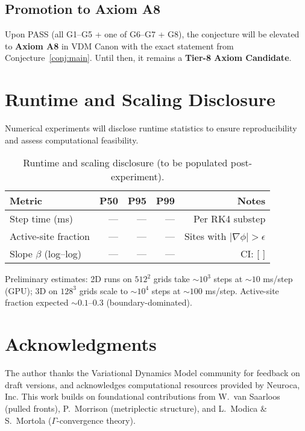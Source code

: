 \documentclass{article}
\begin{document}
\subsection{Promotion to Axiom A8}

Upon PASS (all G1--G5 + one of G6--G7 + G8), the conjecture will be elevated to \textbf{Axiom A8} in VDM Canon with the exact statement from Conjecture~\ref{conj:main}. Until then, it remains a \textbf{Tier-8 Axiom Candidate}.

\section{Runtime and Scaling Disclosure}
\label{sec:runtime}

Numerical experiments will disclose runtime statistics to ensure reproducibility and assess computational feasibility.

\begin{table}[t]
  \centering
  \caption{Runtime and scaling disclosure (to be populated post-experiment).}
  \label{tab:runtime}
  \begin{tabular}{@{}lrrrr@{}}
  \toprule
  Metric & P50 & P95 & P99 & Notes \\
  \midrule
  Step time (ms) & --- & --- & --- & Per RK4 substep \\
  Active-site fraction & --- & --- & --- & Sites with $|\nabla\phi|>\epsilon$ \\
  Slope $\beta$ (log--log) & --- & --- & --- & CI: [\,\,] \\
  \bottomrule
  \end{tabular}
\end{table}

Preliminary estimates: 2D runs on $512^2$ grids take $\sim 10^3$ steps at $\sim 10$ ms/step (GPU); 3D on $128^3$ grids scale to $\sim 10^4$ steps at $\sim 100$ ms/step. Active-site fraction expected $\sim 0.1$--$0.3$ (boundary-dominated).

\section*{Acknowledgments}

The author thanks the Variational Dynamics Model community for feedback on draft versions, and acknowledges computational resources provided by Neuroca, Inc. This work builds on foundational contributions from W.\ van Saarloos (pulled fronts), P.\ Morrison (metriplectic structure), and L.\ Modica \& S.\ Mortola ($\Gamma$-convergence theory).
\end{document}
